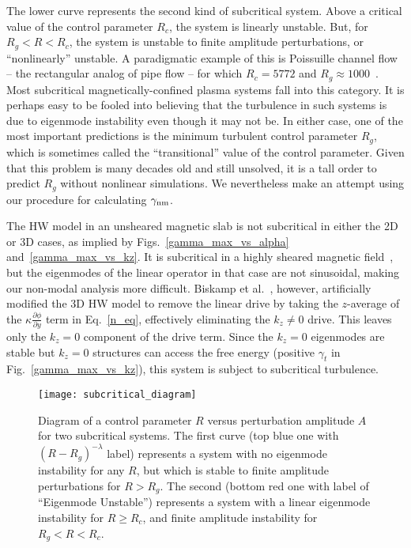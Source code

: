 \documentclass[twocolumn,showkeys,superscriptaddress]{revtex4}
\newcommand{\pdiff}[2]{\frac{\partial#1}{\partial#2}}
\begin{document}
The lower curve represents the second kind of subcritical system. Above a critical value of the control parameter $R_c$, the system is linearly unstable. But, for $R_g < R < R_c$, the system is
unstable to finite amplitude perturbations, or ``nonlinearly'' unstable. A paradigmatic example of this is Poissuille channel flow -- the rectangular analog of pipe flow -- for which
$R_c = 5772$ and $R_g \approx 1000$~\cite{grossmann2000}. Most subcritical magnetically-confined plasma systems fall into this category. It is perhaps easy to be fooled into believing that the turbulence
in such systems is due to eigenmode instability even though it may not be. 
In either case, one of the most important predictions is the minimum turbulent control parameter $R_g$, which is sometimes called the ``transitional'' value of the control parameter. Given that this problem is many decades old
and still unsolved, it is a tall order to predict $R_g$ without nonlinear simulations. We nevertheless make an attempt using our procedure for calculating $\gamma_{\rm{nm}}$.

The HW model in an unsheared magnetic slab is not subcritical in either the 2D or 3D cases, as implied by Figs.~\ref{gamma_max_vs_alpha} and~\ref{gamma_max_vs_kz}. It is subcritical in a highly sheared
magnetic field~\cite{drake1995}, but the eigenmodes of the linear operator in that case are not sinusoidal, making our non-modal analysis more difficult. 
Biskamp et al.~\cite{biskamp1995}, however, artificially modified the
3D HW model to remove the linear drive by taking the $z$-average of the $\kappa \pdiff{\phi}{y}$ term in Eq.~\ref{n_eq}, effectively eliminating the $k_z \ne 0$ drive. This leaves only the $k_z = 0$
component of the drive term. Since the $k_z = 0$ eigenmodes are stable but $k_z = 0$ structures can access the free energy (positive $\gamma_t$ in Fig.~\ref{gamma_max_vs_kz}), this system is subject
to subcritical turbulence.

\begin{figure}
\centerline{\texttt{[image: subcritical\_diagram]}}
\caption{Diagram of a control parameter $R$ versus perturbation amplitude $A$ for two subcritical systems. The first curve (top blue one with $(R-R_g)^{-\lambda}$ label) represents a system with no
eigenmode instability for any $R$, but which is stable to finite amplitude perturbations for $R > R_g$. 
The second (bottom red one with label of ``Eigenmode Unstable'') represents a system with a linear eigenmode instability for $R \ge R_c$, and finite amplitude
instability for $R_g < R < R_c$.}
\label{subcritical_diagram}
\end{figure}
\end{document}
